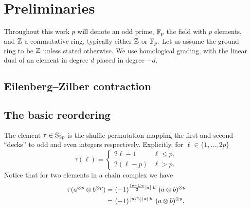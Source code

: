 
\section{Preliminaries}

Throughout this work $p$ will denote an odd prime, ${\mathbb{F}_p}$ the field with $p$ elements, and $\mathbb{Z}$ a commutative ring, typically either $\mathbb{Z}$ or ${\mathbb{F}_p}$.
Let us assume the ground ring to be $\mathbb{Z}$ unless stated otherwise.
We use homological grading, with the linear dual of an element in degree $d$ placed in degree $-d$.

\subsection{Eilenberg--Zilber contraction}

\TBW

\subsection{The basic reordering}\label{ss:reordering}

The element $\tau \in \mathbb{S}_{2p}$ is the shuffle permutation mapping the first and second ``decks'' to odd and even integers respectively.
Explicitly, for $\ell \in \{1,\dots,2p\}$
\begin{equation*}
	\tau(\ell) =
	\begin{cases}
		2\ell-1 & \ell \leq p, \\
		2(\ell-p) & \ell > p.
	\end{cases}
\end{equation*}
Notice that for two elements in a chain complex we have
\begin{align*}
	\tau(a^{\otimes p} \otimes b^{\otimes p}) =&\
	(-1)^{\frac{(p-1)p}{2}\lvert a\rvert\lvert b\rvert} \, (a \otimes b)^{\otimes p} \\ =&\
	(-1)^{\lfloor p/2\rfloor\lvert a\rvert\lvert b\rvert} \, (a \otimes b)^{\otimes p}.
\end{align*}